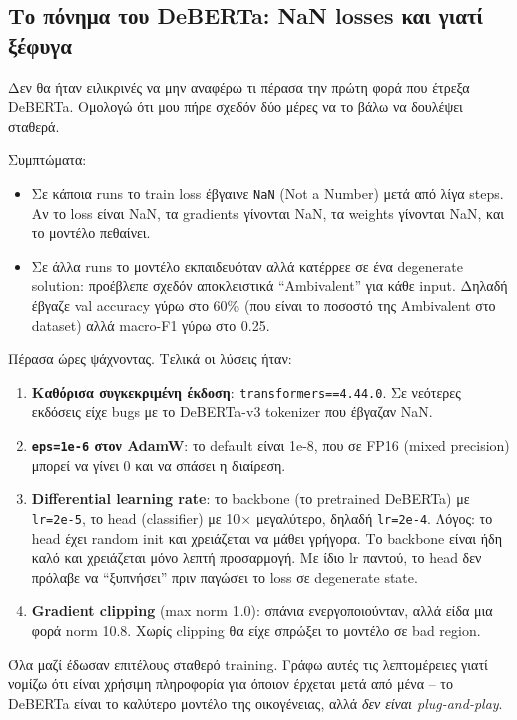 \documentclass[12pt]{fphw}
\begin{document}
\subsection{Το πόνημα του DeBERTa: NaN losses και γιατί ξέφυγα}

Δεν θα ήταν ειλικρινές να μην αναφέρω τι πέρασα την πρώτη φορά που έτρεξα DeBERTa. Ομολογώ ότι μου πήρε σχεδόν δύο μέρες να το βάλω να δουλέψει σταθερά.

Συμπτώματα:
\begin{itemize}
    \item Σε κάποια runs το train loss έβγαινε \texttt{NaN} (Not a Number) μετά από λίγα steps. Αν το loss είναι NaN, τα gradients γίνονται NaN, τα weights γίνονται NaN, και το μοντέλο πεθαίνει.
    \item Σε άλλα runs το μοντέλο εκπαιδευόταν αλλά κατέρρεε σε ένα degenerate solution: προέβλεπε σχεδόν αποκλειστικά ``Ambivalent'' για κάθε input. Δηλαδή έβγαζε val accuracy γύρω στο 60\% (που είναι το ποσοστό της Ambivalent στο dataset) αλλά macro-F1 γύρω στο 0.25.
\end{itemize}

Πέρασα ώρες ψάχνοντας. Τελικά οι λύσεις ήταν:

\begin{enumerate}
    \item \textbf{Καθόρισα συγκεκριμένη έκδοση}: \texttt{transformers==4.44.0}. Σε νεότερες εκδόσεις είχε bugs με το DeBERTa-v3 tokenizer που έβγαζαν NaN.
    \item \textbf{\texttt{eps=1e-6} στον AdamW}: το default είναι 1e-8, που σε FP16 (mixed precision) μπορεί να γίνει 0 και να σπάσει η διαίρεση.
    \item \textbf{Differential learning rate}: το backbone (το pretrained DeBERTa) με \texttt{lr=2e-5}, το head (classifier) με 10× μεγαλύτερο, δηλαδή \texttt{lr=2e-4}. Λόγος: το head έχει random init και χρειάζεται να μάθει γρήγορα. Το backbone είναι ήδη καλό και χρειάζεται μόνο λεπτή προσαρμογή. Με ίδιο lr παντού, το head δεν πρόλαβε να ``ξυπνήσει'' πριν παγώσει το loss σε degenerate state.
    \item \textbf{Gradient clipping} (max norm 1.0): σπάνια ενεργοποιούνταν, αλλά είδα μια φορά norm 10.8. Χωρίς clipping θα είχε σπρώξει το μοντέλο σε bad region.
\end{enumerate}

Όλα μαζί έδωσαν επιτέλους σταθερό training. Γράφω αυτές τις λεπτομέρειες γιατί νομίζω ότι είναι χρήσιμη πληροφορία για όποιον έρχεται μετά από μένα -- το DeBERTa είναι το καλύτερο μοντέλο της οικογένειας, αλλά \emph{δεν είναι plug-and-play}.
\end{document}
